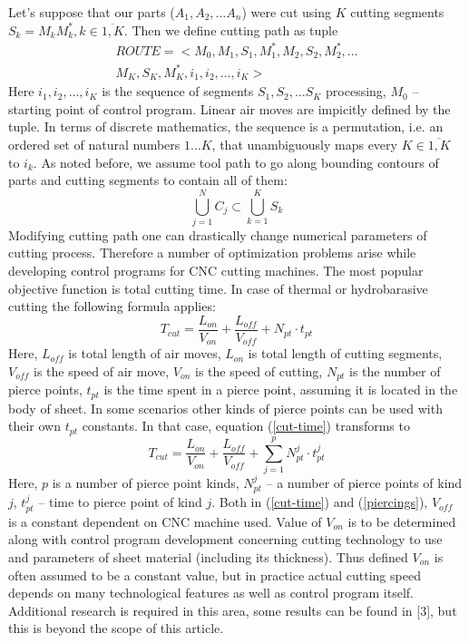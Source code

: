 \documentclass{ifacconf}
\begin{document}
Let's suppose that our parts
($A_1, A_2, \dots A_n$) were cut
using $K$ cutting segments
$S_k = M_kM_k^*, k \in \overline{1, K}$.
Then we define cutting path as tuple
\begin{multline}
    ROUTE =
    \big< M_0, M_1, S_1, M_1^*, M_2, S_2, M_2^*, \dots \\
    M_K, S_K, M_K^*, i_1, i_2, \dots, i_K \big>
  \label{tuple}
\end{multline}
Here $i_1, i_2, \dots, i_K$ is the sequence of segments
$S_1, S_2, \dots S_K$ processing,
$M_0$ -- starting point of control program.
Linear air moves are impicitly defined by the tuple.
In terms of discrete mathematics,
the sequence is a permutation,
i.e. an ordered set of natural numbers $1\dots K$,
that unambiguously maps every
$K \in \overline{1, K}$ to $i_k$.
As noted before,
we assume tool path to go along
bounding contours of parts
and cutting segments to contain all of them:
$$
\bigcup_{j=1}^N C_j \subset \bigcup_{k=1}^K S_k
$$
Modifying cutting path one can
drastically change numerical parameters
of cutting process.
Therefore a number of optimization problems
arise while developing
control programs for CNC cutting machines.
The most popular objective function
is total cutting time.
In case of thermal or
hydrobarasive cutting the following formula applies:
\begin{equation}
    T_{cut} = \frac{L_{on}}{V_{on}} + \frac{L_{off}}{V_{off}} + N_{pt} \cdot t_{pt}
    \label{cut-time}
\end{equation}
Here,
$L_{off}$ is total length of air moves,
$L_{on}$ is total length of cutting segments,
$V_{off}$ is the speed of air move,
$V_{on}$ is the speed of cutting,
$N_{pt}$ is the number of pierce points,
$t_{pt}$ is the time spent in a pierce point,
assuming it is located in the body of sheet.
In some scenarios other kinds of pierce points
can be used
with their own $t_{pt}$ constants.
In that case, equation (\ref{cut-time})
transforms to
\begin{equation}
    T_{cut} = \frac{L_{on}}{V_{on}} + \frac{L_{off}}{V_{off}}
    + \sum_{j=1}^p N_{pt}^j \cdot t_{pt}^j
    \label{piercings}
\end{equation}
Here,
$p$ is a number of pierce point kinds,
$N_{pt}^j$ -- a number of pierce points of kind $j$,
$t_{pt}^j$ -- time to pierce point of kind $j$.
Both in (\ref{cut-time}) and (\ref{piercings}),
$V_{off}$ is a constant dependent on CNC machine used.
Value of $V_{on}$ is to be determined along with
control program development
concerning cutting technology to use
and parameters of sheet material
(including its thickness).
Thus defined $V_{on}$
is often assumed to be a constant value,
but in practice
actual cutting speed depends on
many technological features as well as
control program itself.
Additional research is required in this area,
some results can be found in [3],
but this is beyond the scope of this article.
\end{document}
